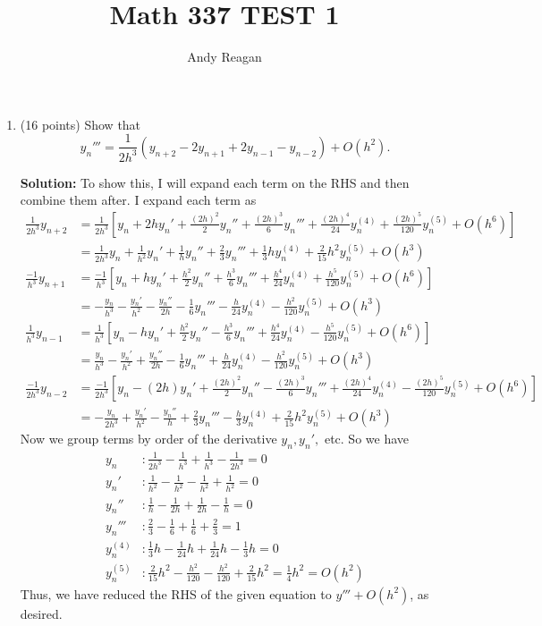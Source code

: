 \documentclass[11pt]{article}
\author{Andy Reagan}
\title{Math 337 TEST 1}
\def\f{\frac }
\newcommand{\oh}[1]{O(h^{{#1}})}
\begin{document}
\maketitle

\begin{enumerate}

\item (16 points) Show that
\[ y_n ''' = \f{1}{2h^3} \left ( y_{n+2} - 2 y_{n+1} + 2 y_{n-1} - y_{n-2} \right ) + \oh{2} .\]

\bigskip
\textbf{Solution:} To show this, I will expand each term on the RHS and then combine them after.
I expand each term as
\begin{align*} \f{1}{2h^3} y_{n+2} &=  \f{1}{2h^3} \left [ y_n + 2h y_n ' + \f{(2h)^2}{2} y_n'' + \f{(2h)^3}{6} y_n''' + \f{(2h)^4}{24} y_n^{(4)} + \f{(2h)^5}{120} y_n^{(5)} + \oh{6} \right ] \\
&= \f{1}{2h^3} y_n + \f{1}{h^2}y_n ' + \f{1}{h} y_n'' + \f{2}{3} y_n''' + \f{1}{3} h y_n^{(4)} + \f{2}{15} h^2 y_n^{(5)} + \oh{3} \\
\f{-1}{h^3} y_{n+1} &=  \f{-1}{h^3} \left [ y_n + h y_n ' + \f{h^2}{2} y_n'' + \f{h^3}{6} y_n''' + \f{h^4}{24} y_n^{(4)} + \f{h^5}{120} y_n^{(5)} + \oh{6} \right ]\\
&= -\f{y_n}{h^3} - \f{y_n'}{h^2} - \f{y_n''}{2h}  - \f{1}{6} y_n''' - \f{h}{24} y_n^{(4)} - \f{h^2}{120} y_n^{(5)} + \oh{3} \\
\f{1}{h^3} y_{n-1} &=  \f{1}{h^3} \left [ y_n - h y_n ' + \f{h^2}{2} y_n'' - \f{h^3}{6} y_n''' + \f{h^4}{24} y_n^{(4)} - \f{h^5}{120} y_n^{(5)} + \oh{6} \right ]\\
&= \f{y_n}{h^3} - \f{y_n'}{h^2} + \f{y_n''}{2h}  - \f{1}{6} y_n''' + \f{h}{24} y_n^{(4)} - \f{h^2}{120} y_n^{(5)} + \oh{3} \\
\f{-1}{2h^3} y_{n-2} &=  \f{-1}{2h^3} \left [ y_n - (2h) y_n ' + \f{(2h)^2}{2} y_n'' - \f{(2h)^3}{6} y_n''' + \f{(2h)^4}{24} y_n^{(4)} - \f{(2h)^5}{120} y_n^{(5)} + \oh{6} \right ]\\
&= -\f{y_n}{2h^3} + \f{y_n'}{h^2} - \f{y_n''}{h}  + \f{2}{3} y_n''' - \f{h}{3} y_n^{(4)} + \f{2}{15}h^2 y_n^{(5)} + \oh{3} \end{align*}
Now we group terms by order of the derivative $y_n,y_n',$ etc.
So we have
\begin{align*} y_n &: \f{1}{2h^3} - \f{1}{h^3} + \f{1}{h^3} - \f{1}{2h^3} = 0\\
y_n' &: \f{1}{h^2} - \f{1}{h^2} - \f{1}{h^2} + \f{1}{h^2} = 0\\
y_n'' &: \f{1}{h} - \f{1}{2h} + \f{1}{2h} - \f{1}{h} = 0\\
y_n''' &: \f{2}{3} - \f{1}{6} + \f{1}{6} + \f{2}{3} = 1\\
y_n^{(4)} &: \f{1}{3}h - \f{1}{24}h + \f{1}{24}h - \f{1}{3}h = 0\\
y_n^{(5)} &: \f{2}{15}h^2 - \f{h^2}{120} - \f{h^2}{120} + \f{2}{15}h^2 = \f{1}{4}h^2 = \oh{2}\end{align*}
Thus, we have reduced the RHS of the given equation to $y''' + \oh{2}$, as desired.


\end{enumerate}
\end{document}
